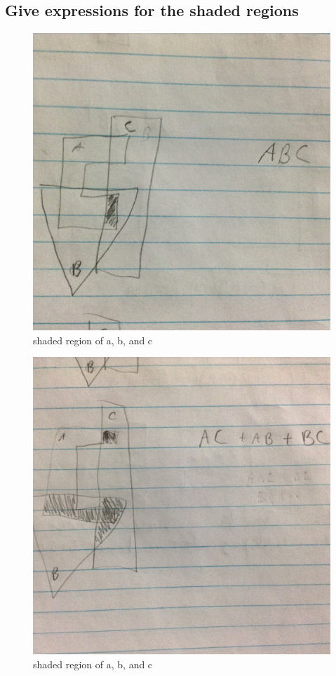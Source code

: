 \documentclass{article}
\begin{document}
	\subsection{Give expressions for the shaded regions}
	\begin{figure}[H]
		\includegraphics[width=\linewidth]{2.23/fig3.JPG}
		\caption{shaded region of a, b, and c}
	\end{figure}
	\begin{figure}[H]
		\includegraphics[width=\linewidth]{2.23/fig4.JPG}
		\caption{shaded region of a, b, and c}
	\end{figure}
\end{document}
